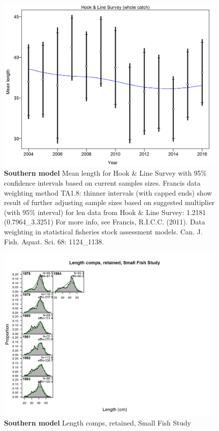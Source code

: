\documentclass[12pt,]{article}
\begin{document}
\begin{figure}[htbp]
\centering
\includegraphics{./tex2pdf.8516/f16c585bfe77f92c409800255f5bda7db2a091f5.png}
\caption{\textbf{Southern model} Mean length for Hook \& Line Survey
with 95\% confidence intervals based on current samples sizes. Francis
data weighting method TA1.8: thinner intervals (with capped ends) show
result of further adjusting sample sizes based on suggested multiplier
(with 95\% interval) for len data from Hook \& Line Survey: 1.2181
(0.7964\_3.3251) For more info, see Francis, R.I.C.C. (2011). Data
weighting in statistical fisheries stock assessment models. Can. J.
Fish. Aquat. Sci. 68: 1124\_1138.
\label{fig:mod2_16_comp_lenfit_data_weighting_TA1.8_Hook & Line Survey}}
\end{figure}

\begin{figure}[htbp]
\centering
\includegraphics{./r4ss/plots_mod2/comp_lenfit_flt6mkt2.png}
\caption{\textbf{Southern model} Length comps, retained, Small Fish
Study \label{fig:mod2_17_comp_lenfit_flt6mkt2}}
\end{figure}
\end{document}
